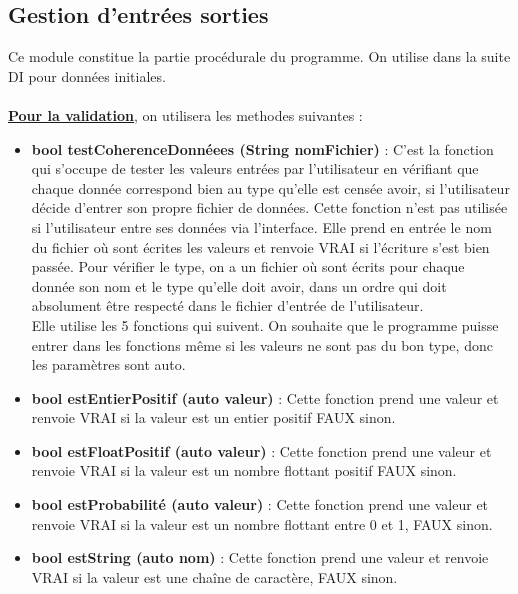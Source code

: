 \documentclass[a4paper,11pt]{article}
\begin{document}
		\subsection{Gestion d'entrées sorties}
			Ce module constitue la partie procédurale du programme. On utilise dans la suite DI pour données initiales.\\
			\\
			\underline{\bf Pour la validation}, on utilisera les methodes suivantes :\\
			\begin{itemize}
				\item \textbf{bool testCoherenceDonnéees (String nomFichier)} : C’est la fonction qui s’occupe de tester les valeurs entrées par l’utilisateur en vérifiant que chaque donnée correspond bien au type qu’elle est censée avoir, si l'utilisateur décide d'entrer son propre fichier de données. Cette fonction n'est pas utilisée si l'utilisateur entre ses données via l'interface.
					Elle prend en entrée le nom du fichier où sont écrites les valeurs et renvoie VRAI si l'écriture s'est bien passée.
					Pour vérifier le type, on a un fichier où sont écrits pour chaque donnée son nom et le type qu’elle doit avoir, dans un ordre qui doit absolument être respecté dans le fichier d'entrée de l'utilisateur.\\
					Elle utilise les 5 fonctions qui suivent. On souhaite que le programme puisse entrer dans les fonctions même si les valeurs ne sont pas du bon type, donc les paramètres sont auto.\vspace{0.2cm}
				\item \textbf{bool estEntierPositif (auto valeur)} : Cette fonction prend une valeur et renvoie VRAI si la valeur est un entier positif FAUX sinon.\vspace{0.2cm}
				\item \textbf{bool estFloatPositif (auto valeur)} : Cette fonction prend une valeur et renvoie VRAI si la valeur est un nombre flottant positif FAUX sinon.\vspace{0.2cm}
				\item \textbf{bool estProbabilité (auto valeur)} : Cette fonction prend une valeur et renvoie VRAI si la valeur est un nombre flottant entre 0 et 1, FAUX sinon.\vspace{0.2cm}
				\item \textbf{bool estString (auto nom)} : 	Cette fonction prend une valeur et renvoie VRAI si la valeur est une chaîne de caractère, FAUX sinon.\vspace{0.2cm}

\end{itemize}
\end{document}
